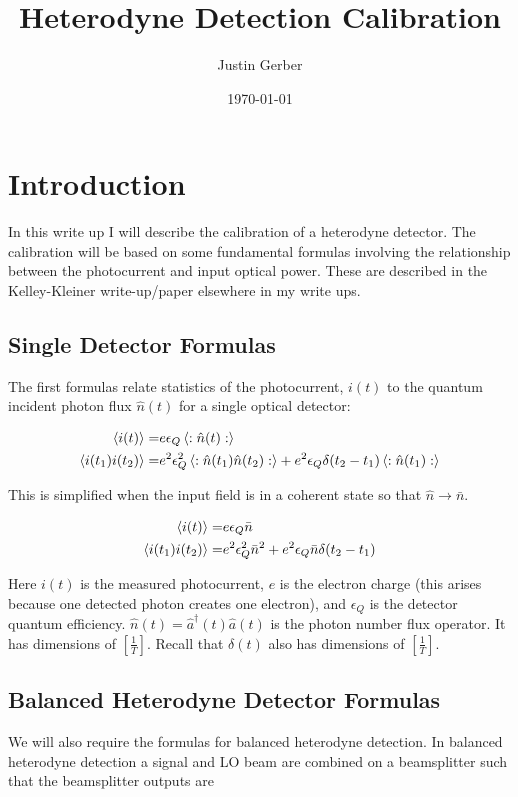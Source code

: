 \documentclass[12pt]{article}
\newcommand{\ep}{\epsilon}
\begin{document}
\title{Heterodyne Detection Calibration}
\author{Justin Gerber}
\date{\today}
\maketitle

\section{Introduction}

In this write up I will describe the calibration of a heterodyne detector.
The calibration will be based on some fundamental formulas involving the relationship between the photocurrent and input optical power. 
These are described in the Kelley-Kleiner write-up/paper elsewhere in my write ups.
\subsection{Single Detector Formulas}
The first formulas relate statistics of the photocurrent, $i(t)$ to the quantum incident photon flux $\hat{n}(t)$ for a single optical detector:

\begin{align}
\Braket{i(t)} =& e\ep_Q \Braket{:\hat{n}(t):}\\
\Braket{i(t_1)i(t_2)} =& e^2 \ep_Q^2 \Braket{:\hat{n}(t_1)\hat{n}(t_2):} + e^2 \ep_Q \delta(t_2-t_1) \Braket{:\hat{n}(t_1):}
\end{align}

This is simplified when the input field is in a coherent state so that $\hat{n}\rightarrow \bar{n}$.

\begin{align}
\label{eq:singledet1}
\Braket{i(t)} =& e\ep_Q \bar{n}\\
\label{eq:singledet2}
\Braket{i(t_1)i(t_2)} =& e^2 \ep_Q^2 \bar{n}^2 + e^2 \ep_Q \bar{n} \delta(t_2-t_1) 
\end{align}

Here $i(t)$ is the measured photocurrent, $e$ is the electron charge (this arises because one detected photon creates one electron), and $\ep_Q$ is the detector quantum efficiency.
$\hat{n}(t) = \hat{a}^{\dag}(t)\hat{a}(t)$ is the photon number flux operator.
It has dimensions of $\left[\frac{1}{T}\right]$.
Recall that $\delta(t)$ also has dimensions of $\left[\frac{1}{T}\right]$.

\subsection{Balanced Heterodyne Detector Formulas}
We will also require the formulas for balanced heterodyne detection.
In balanced heterodyne detection a signal and LO beam are combined on a beamsplitter such that the beamsplitter outputs are
\end{document}
